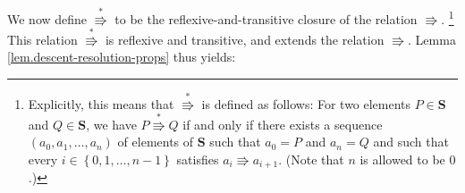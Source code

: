 \documentclass[numbers=enddot,12pt,final,onecolumn,notitlepage]{scrartcl}%
\theoremstyle{definition}
\newenvironment{proof}[1][Proof]{\noindent\textbf{#1.} }{\ \rule{0.5em}{0.5em}}
\begin{document}





We now define $\overset{\ast}{\Rrightarrow}$ to be the
reflexive-and-transitive closure of the relation $\Rrightarrow$.
\footnote{Explicitly, this means that $\overset{\ast}{\Rrightarrow}$
is defined as follows: For two elements $P\in\mathbf{S}$ and $Q\in\mathbf{S}$,
we have $P\overset{\ast}{\Rrightarrow}Q$ if and only if there exists a
sequence $\left(  a_{0},a_{1},\ldots,a_{n}\right)  $ of elements of
$\mathbf{S}$ such that $a_{0}=P$ and $a_{n}=Q$ and such that every
$i\in\left\{  0,1,\ldots,n-1\right\}  $ satisfies $a_{i}\Rrightarrow a_{i+1}%
$. (Note that $n$ is allowed to be $0$.)}
This relation $\overset{\ast}{\Rrightarrow}$ is reflexive and transitive,
and extends the relation $\Rrightarrow$.
Lemma \ref{lem.descent-resolution-props} thus yields:
\end{document}
